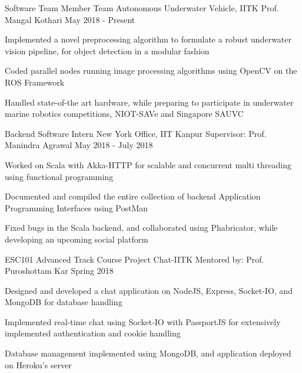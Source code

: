 
\begin{cventries}

  \cventry
    {Software Team Member}
    {Team Autonomous Underwater Vehicle, IITK}
    {Prof. Mangal Kothari}
    {May 2018 - Present}
    {
      \begin{cvitems}
        \item {Implemented a novel preprocessing algorithm to formulate a robust underwater vision pipeline, for object detection in a modular fashion}
        \item {Coded parallel nodes running image processing algorithms using OpenCV on the ROS Framework}
        \item {Handled state-of-the art hardware, while preparing to participate in underwater marine robotics competitions, NIOT-SAVe and Singapore SAUVC }
      \end{cvitems}
    }

  \cventry
    {Backend Software Intern}
    {New York Office, IIT Kanpur}
    {Supervisor: Prof. Manindra Agrawal}
    {May 2018 - July 2018}
    {
      \begin{cvitems}
        \item{Worked on Scala with Akka-HTTP for scalable and concurrent multi threading using functional programming}
        \item{Documented and compiled the entire collection of backend Application Programming Interfaces using PostMan}
        \item{Fixed bugs in the Scala backend, and collaborated using Phabricator, while developing an upcoming social platform}
      \end{cvitems}
    }

  \cventry
    {ESC101 Advanced Track Course Project}
    {Chat-IITK}
    {Mentored by: Prof. Puroshottam Kar}
    {Spring 2018}
    {
      \begin{cvitems}
        \item {Designed and developed a chat application on NodeJS, Express, Socket-IO, and MongoDB for database handling}
        \item {Implemented real-time chat using Socket-IO with PassportJS for extensively implemented authentication and cookie handling}
        \item {Database management implemented using MongoDB, and application deployed on Heroku's server}
      \end{cvitems}
    }

\end{cventries}
